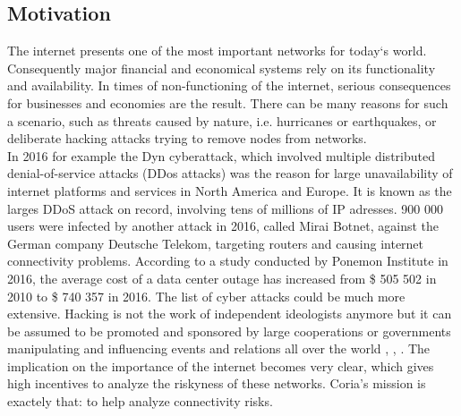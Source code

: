 \documentclass[conference, 11pt]{IEEEtran}
\begin{document}
\subsection{Motivation}
The internet presents one of the most important networks for today‘s world. Consequently major financial and economical systems rely on its functionality and availability. In times of non-functioning of the internet, serious consequences for businesses and economies are the result. There can be many reasons for such a scenario, such as threats caused by nature, i.e. hurricanes or earthquakes, or deliberate hacking attacks trying to remove nodes from networks.\\ \linebreak
In 2016 for example the Dyn cyberattack, which involved multiple distributed denial-of-service attacks (DDos attacks) was the reason for large unavailability of internet platforms and services in North America and Europe. It is known as the larges DDoS attack on record, involving tens of millions of IP adresses\cite{dyn}. 900 000 users were infected by another attack in 2016, called Mirai Botnet, against the German company Deutsche Telekom, targeting routers and causing internet connectivity problems\cite{DT}. According to a study conducted by Ponemon Institute in 2016, the average cost of a data center outage has increased from \$ 505 502 in 2010 to \$ 740 357 in 2016\cite{Ponemon}. The list of cyber attacks could be much more extensive. Hacking is not the work of independent ideologists anymore but it can be assumed to be promoted and sponsored by large cooperations or governments manipulating and influencing events and relations all over the world \cite{cyberSponsors}, \cite{cyberSponsors2}, \cite{cyberSponsors3}. The implication on the importance of the internet becomes very clear, which gives high incentives to analyze the riskyness of these networks. Coria's mission is exactely that: to help analyze connectivity risks\cite{Coria}. \linebreak
\end{document}
